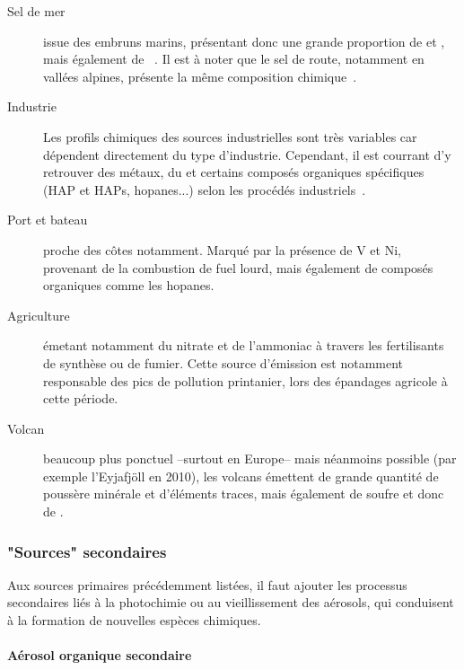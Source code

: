 \begin{description}
    \item[Sel de mer] issue des embruns marins, présentant donc une grande proportion de
         et , mais également de
        ~\autocite{belisCritical2013,odowdMarine1997,pioClimatology2007}. Il
        est à noter que le sel de route, notamment en vallées alpines, présente la même
        composition chimique~\autocite{airrhone-alpesInfluence2012}.

    \item[Industrie] Les profils chimiques des sources industrielles sont très variables
        car dépendent directement du type d'industrie. Cependant, il est courrant d'y
        retrouver des métaux, du \SOq et certains composés organiques spécifiques (HAP et
        HAPs, hopanes...) selon les procédés
        industriels~\autocite{sylvestreComprehensive2017}.

    \item[Port et bateau] proche des côtes notamment. Marqué par la présence de V et Ni,
        provenant de la combustion de fuel lourd, mais également de composés organiques
        comme les hopanes.

    \item[Agriculture] émetant notamment du nitrate et de l'ammoniac à travers les
        fertilisants de synthèse ou de fumier. Cette source d'émission est notamment
        responsable des pics de pollution printanier, lors des épandages agricole à cette
        période.

    \item[Volcan] beaucoup plus ponctuel --surtout en Europe-- mais néanmoins possible
        (par exemple l'Eyjafjöll en 2010), les volcans émettent de grande quantité de
        poussère minérale et d'éléments traces, mais également de soufre et donc de \SOq.

\end{description}

\subsubsection{"Sources" secondaires}%
\label{ssub:_sources_secondaires}

Aux sources primaires précédemment listées, il faut ajouter les processus secondaires liés
à la photochimie ou au vieillissement des aérosols, qui conduisent à la formation de
nouvelles espèces chimiques.

\paragraph{Aérosol organique secondaire}%
\label{par:aérosol_organique_secondaire}

